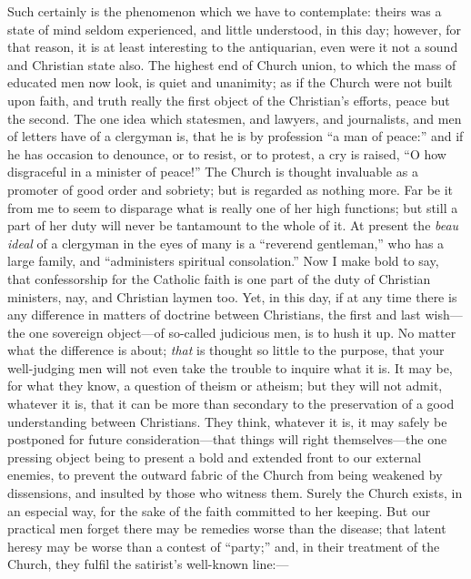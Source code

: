 Such certainly is the phenomenon which we have to contemplate:
theirs was a state of mind seldom experienced, and little understood,
in this day; however, for that reason, it is at least interesting to
the antiquarian, even were it not a sound and Christian state also.
The highest end of Church union, to which the mass of educated men now
look, is quiet and unanimity; as if the Church were not built upon
faith, and truth really the first object of the Christian's efforts,
peace but the second. The one idea which statesmen, and lawyers, and
journalists, and men of letters have of a clergyman is, that he
is by profession ``a man of peace:'' and if he has occasion to
denounce, or to resist, or to protest, a cry is raised, ``O how
disgraceful in a minister of peace!'' The Church is thought
invaluable as a promoter of good order and sobriety; but is regarded
as nothing more. Far be it from me to seem to disparage what is really
one of her high functions; but still a part of her duty will never be
tantamount to the whole of it. At present the \emph{beau ideal} of a
clergyman in the eyes of many is a ``reverend gentleman,'' who
has a large family, and ``administers spiritual consolation.''
Now I make bold to say, that confessorship for the Catholic faith is
one part of the duty of Christian ministers, nay, and Christian laymen
too. Yet, in this day, if at any time there is any difference in
matters of doctrine between Christians, the first and last wish—the
one sovereign object—of so-called judicious men, is to hush it up.
No matter what the difference is about; \emph{that} is thought so
little to the purpose, that your well-judging men will not even take
the trouble to inquire what it is. It may be, for what they know, a
question of theism or atheism; but they will not admit, whatever it
is, that it can be more than secondary to the preservation of a good
understanding between Christians. They think, whatever it is, it may
safely be postponed for future consideration—that things will right
themselves—the one pressing object being to present a bold and
extended front to our external enemies, to prevent the outward fabric
of the Church from being weakened by dissensions, and insulted by
those who witness them. Surely the Church exists, in an especial way,
for the sake of the faith committed to her keeping. But our practical
men forget there may be remedies worse than the disease; that latent
heresy may be worse than a contest of ``party;'' and, in
their treatment of the Church, they fulfil the satirist's well-known
line:—


